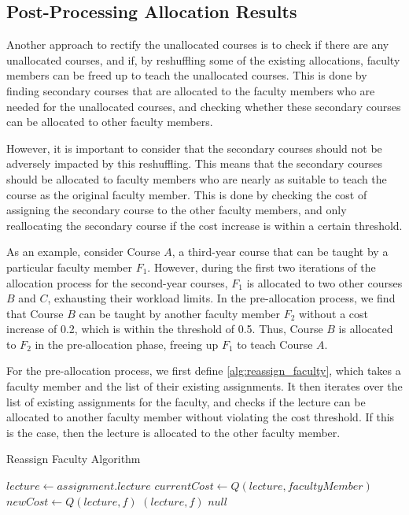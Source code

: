 \subsection{Post-Processing Allocation Results}
\label{sec:post_allocation}

Another approach to rectify the unallocated courses is to check if there are any unallocated courses, and if, by reshuffling some of the existing allocations, faculty members can be freed up to teach the unallocated courses. This is done by finding secondary courses that are allocated to the faculty members who are needed for the unallocated courses, and checking whether these secondary courses can be allocated to other faculty members.

However, it is important to consider that the secondary courses should not be adversely impacted by this reshuffling. This means that the secondary courses should be allocated to faculty members who are nearly as suitable to teach the course as the original faculty member. This is done by checking the cost of assigning the secondary course to the other faculty members, and only reallocating the secondary course if the cost increase is within a certain threshold.

As an example, consider Course $A$, a third-year course that can be taught by a particular faculty member $F_1$. However, during the first two iterations of the allocation process for the second-year courses, $F_1$ is allocated to two other courses $B$ and $C$, exhausting their workload limits. In the pre-allocation process, we find that Course $B$ can be taught by another faculty member $F_2$ without a cost increase of 0.2, which is within the threshold of 0.5. Thus, Course $B$ is allocated to $F_2$ in the pre-allocation phase, freeing up $F_1$ to teach Course $A$.

For the pre-allocation process, we first define \autoref{alg:reassign_faculty}, which takes a faculty member and the list of their existing assignments. It then iterates over the list of existing assignments for the faculty, and checks if the lecture can be allocated to another faculty member without violating the cost threshold. If this is the case, then the lecture is allocated to the other faculty member.

\begin{algorithm}[H]
  \caption{Reassign Faculty Algorithm}
  \begin{algorithmic}[1]
    \State $lecture \gets assignment.lecture$
    \State $currentCost \gets Q(lecture, facultyMember)$
    \State $newCost \gets Q(lecture, f)$
    \Return $(lecture, f)$
    \EndIf
    \EndFor
    \EndFor
    \State \Return $null$
    \EndProcedure
  \end{algorithmic}
  \label{alg:reassign_faculty}
\end{algorithm}

